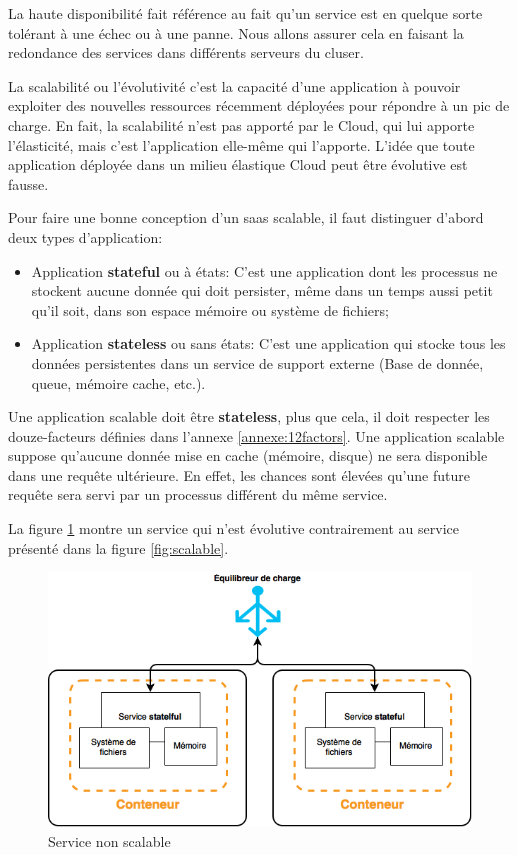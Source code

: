 \begin{onehalfspace}
La haute disponibilité fait référence au fait qu'un service est en quelque sorte tolérant à une échec ou à une panne. Nous allons assurer cela en faisant la redondance des services dans différents serveurs du cluser.

La scalabilité ou l'évolutivité c'est la capacité d'une application à pouvoir exploiter des nouvelles ressources récemment déployées pour répondre à un pic de charge. En fait, la scalabilité n'est pas apporté par le Cloud, qui lui apporte l'élasticité, mais c'est l'application elle-même qui l'apporte. L'idée que toute application déployée dans un milieu élastique Cloud peut être évolutive est fausse.


Pour faire une bonne conception d'un \acrshort{saas} scalable, il faut distinguer d'abord deux types d'application:

\begin{itemize}
	\item Application \textbf{stateful} ou à états: C'est une application dont les processus ne stockent aucune donnée qui doit persister, même dans un temps aussi petit qu'il soit, dans son espace mémoire ou système de fichiers;
	\item Application \textbf{stateless} ou sans états: C'est une application qui stocke tous les données persistentes dans un service de support externe (Base de donnée, queue, mémoire cache, etc.).
\end{itemize}

Une application scalable doit être \textbf{stateless}, plus que cela, il doit respecter les douze-facteurs définies dans l'annexe \ref{annexe:12factors}. Une application scalable suppose qu'aucune donnée mise en cache (mémoire, disque) ne sera disponible dans une requête ultérieure. En effet, les chances sont élevées qu'une future requête sera servi par un processus différent du même service.


La figure \ref{fig:non-scalable} montre un service qui n'est évolutive contrairement au service présenté dans la figure \ref{fig:scalable}.


\begin{figure}[H]
\centering
\includegraphics [scale=0.5]{chapitre4/assets/stateful}
\caption{Service non scalable}
\label{fig:non-scalable}
\end{figure}


\end{onehalfspace}
